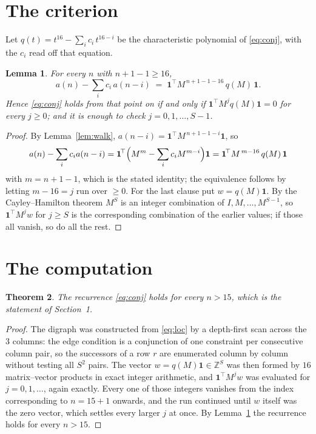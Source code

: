 \documentclass[11pt,a4paper]{article}
\theoremstyle{plain}
\newtheorem{theorem}{Theorem}
\newtheorem{lemma}[theorem]{Lemma}
\theoremstyle{definition}
\begin{document}
\section{The criterion}

Let $q(t)=t^{16}-\sum_i c_i\,t^{16-i}$ be the characteristic polynomial of
\eqref{eq:conj}, with the $c_i$ read off that equation.

\begin{lemma}\label{lem:crit}
For every $n$ with $n+1-1\ge16$,
\[
a(n)-\sum_i c_i\,a(n-i)\;=\;\mathbf{1}^{\!\top}M^{\,n+1-1-16}\,q(M)\,\mathbf{1} .
\]
Hence \eqref{eq:conj} holds from that point on if and only if
$\mathbf{1}^{\!\top}M^{j}q(M)\mathbf{1}=0$ for every $j\ge0$; and it is enough to check
$j=0,1,\dots,S-1$.
\end{lemma}

\begin{proof}
By Lemma~\ref{lem:walk}, $a(n-i)=\mathbf{1}^{\!\top}M^{\,n+1-1-i}\mathbf{1}$, so
\[
a(n)-\sum_i c_i a(n-i)
=\mathbf{1}^{\!\top}\Bigl(M^{m}-\sum_i c_i M^{m-i}\Bigr)\mathbf{1}
=\mathbf{1}^{\!\top}M^{\,m-16}\,q(M)\,\mathbf{1}
\]
with $m=n+1-1$, which is the stated identity; the equivalence follows by letting
$m-16=j$ run over $\ge0$. For the last clause put $w=q(M)\mathbf{1}$. By the
Cayley--Hamilton theorem $M^{S}$ is an integer combination of $I,M,\dots,M^{S-1}$, so
$\mathbf{1}^{\!\top}M^{j}w$ for $j\ge S$ is the corresponding combination of the earlier
values; if those all vanish, so do all the rest.
\end{proof}

\section{The computation}

\begin{theorem}
The recurrence \eqref{eq:conj} holds for every $n>15$, which is the statement of
Section~1.
\end{theorem}

\begin{proof}
The digraph was constructed from \eqref{eq:loc} by a depth-first scan across the $3$
columns: the edge condition is a conjunction of one constraint per consecutive column
pair, so the successors of a row $r$ are enumerated column by column without testing all
$S^2$ pairs. The vector $w=q(M)\mathbf{1}\in\mathbb{Z}^{S}$ was then formed by $16$
matrix--vector products in exact integer arithmetic, and $\mathbf{1}^{\!\top}M^{j}w$ was
evaluated for $j=0,1,\dots$, again exactly. Every one of those integers vanishes from the
index corresponding to $n=15+1$ onwards, and the run continued until $w$ itself was the
zero vector, which settles every larger $j$ at once. By Lemma~\ref{lem:crit} the recurrence
holds for every $n>15$.
\end{proof}
\end{document}
